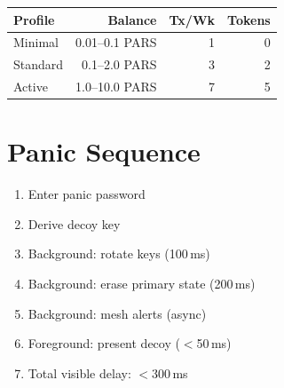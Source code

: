 \documentclass[11pt,a4paper]{article}
\begin{document}
\begin{table}[h]
\centering
\begin{tabular}{@{}lrrr@{}}
\toprule
\textbf{Profile} & \textbf{Balance} & \textbf{Tx/Wk} & \textbf{Tokens} \\
\midrule
Minimal  & 0.01--0.1 PARS & 1 & 0 \\
Standard & 0.1--2.0 PARS  & 3 & 2 \\
Active   & 1.0--10.0 PARS & 7 & 5 \\
\bottomrule
\end{tabular}
\end{table}

\section{Panic Sequence}
\label{app:sequence}

\begin{enumerate}
    \item Enter panic password
    \item Derive decoy key
    \item Background: rotate keys (100\,ms)
    \item Background: erase primary state (200\,ms)
    \item Background: mesh alerts (async)
    \item Foreground: present decoy ($<$50\,ms)
    \item Total visible delay: $<$300\,ms
\end{enumerate}
\end{document}
